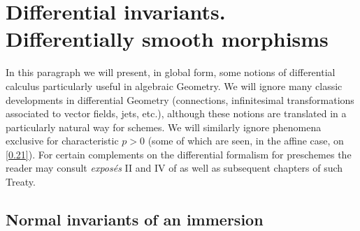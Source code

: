 \setcounter{section}{15}
\section{Differential invariants. Differentially smooth morphisms}
\label{section:IV.16}


In this paragraph we will present, in global form, some notions of differential calculus particularly useful in algebraic Geometry. We will ignore many classic developments in differential Geometry (connections, infinitesimal transformations associated to vector fields, jets, etc.), although these notions are translated in a particularly natural way for schemes. We will similarly ignore phenomena exclusive for characteristic $p>0$ (some of which are seen, in the affine case, on \ref{0.21}). For certain complements on the differential formalism for preschemes the reader may consult \textit{exposés} II and IV of \cite{SGA3} as well as subsequent chapters of such Treaty. 


\subsection{Normal invariants of an immersion}
\label{IV.16.1}

\begin{env}[16.1.1]
\label{IV.16.1.1}
\end{env}